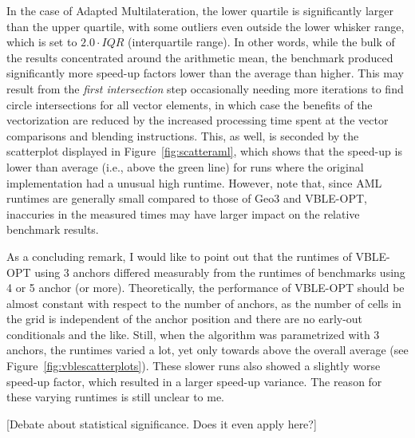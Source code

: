 In the case of Adapted Multilateration, the lower quartile is significantly larger than the upper quartile, with some outliers even outside the lower whisker range, which is set to $2.0 \cdot IQR$ (interquartile range). In other words, while the bulk of the results concentrated around the arithmetic mean, the benchmark produced significantly more speed-up factors lower than the average than higher. This may result from the \emph{first intersection} step occasionally needing more iterations to find circle intersections for all vector elements, in which case the benefits of the vectorization are reduced by the increased processing time spent at the vector comparisons and blending instructions. This, as well, is seconded by the scatterplot displayed in Figure~\ref{fig:scatteraml}, which shows that the speed-up is lower than average (i.e., above the green line) for runs where the original implementation had a unusual high runtime. However, note that, since AML runtimes are generally small compared to those of Geo3 and VBLE-OPT, inaccuries in the measured times may have larger impact on the relative benchmark results.

As a concluding remark, I would like to point out that the runtimes of VBLE-OPT using 3 anchors differed measurably from the runtimes of benchmarks using 4 or 5 anchor (or more). Theoretically, the performance of VBLE-OPT should be almost constant with respect to the number of anchors, as the number of cells in the grid is independent of the anchor position and there are no early-out conditionals and the like. Still, when the algorithm was parametrized with 3 anchors, the runtimes varied a lot, yet only towards above the overall average (see Figure~\ref{fig:vblescatterplots}). These slower runs also showed a slightly worse speed-up factor, which resulted in a larger speed-up variance. The reason for these varying runtimes is still unclear to me.

[Debate about statistical significance. Does it even apply here?]